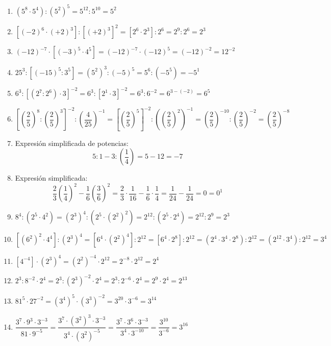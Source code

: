 \documentclass[a4paper,12pt]{article}
\begin{document}
\begin{enumerate}[label=\alph*.]
    \item $(5^{8} \cdot 5^{4}) : (5^{2})^{5} = 5^{12} : 5^{10} = 5^{2}$
    \item $[(-2)^{6} \cdot (+2)^{3}] : [(+2)^{3}]^{2} = [2^{6} \cdot 2^{3}] : 2^{6} = 2^{9} : 2^{6} = 2^{3}$
    \item $(-12)^{-7} \cdot [(-3)^{5} \cdot 4^{5}] = (-12)^{-7} \cdot (-12)^{5} = (-12)^{-2} = 12^{-2}$
    \item $25^{3} : [(-15)^{5} : 3^{5}] = (5^{2})^{3} : (-5)^{5} = 5^{6} : (-5^{5}) = -5^{1}$
    \item $6^{3} : [(2^{7} : 2^{6}) \cdot 3]^{-2} = 6^{3} : [2^{1} \cdot 3]^{-2} = 6^{3} : 6^{-2} = 6^{3 - (-2)} = 6^{5}$
    \item $\left[\left(\dfrac{2}{5}\right)^{8} : \left(\dfrac{2}{5}\right)^{3}\right]^{-2} : \left(\dfrac{4}{25}\right)^{-1} = \left[\left(\dfrac{2}{5}\right)^{5}\right]^{-2} : \left(\left(\dfrac{2}{5}\right)^{2}\right)^{-1} = \left(\dfrac{2}{5}\right)^{-10} : \left(\dfrac{2}{5}\right)^{-2} = \left(\dfrac{2}{5}\right)^{-8}$
    \item Expresión simplificada de potencias:
    \[ 5 : 1 - 3 : \left(\frac{1}{4}\right) = 5 - 12 = -7 \]
    \item Expresión simplificada:
    \[ \frac{2}{3}\left(\frac{1}{4}\right)^{2} - \frac{1}{6}\left(\frac{3}{6}\right)^{2} = \frac{2}{3} \cdot \frac{1}{16} - \frac{1}{6} \cdot \frac{1}{4} = \frac{1}{24} - \frac{1}{24} = 0 = 0^{1} \]
    \item $8^{4} : (2^{5} \cdot 4^{2}) = (2^{3})^{4} : (2^{5} \cdot (2^{2})^{2}) = 2^{12} : (2^{5} \cdot 2^{4}) = 2^{12} : 2^{9} = 2^{3}$
    \item $[(6^{2})^{2} \cdot 4^{4}] : (2^{3})^{4} = [6^{4} \cdot (2^{2})^{4}] : 2^{12} = [6^{4} \cdot 2^{8}] : 2^{12} = (2^{4} \cdot 3^{4} \cdot 2^{8}) : 2^{12} = (2^{12} \cdot 3^{4}) : 2^{12} = 3^{4}$
    \item $[4^{-4}] \cdot (2^{3})^{4} = (2^{2})^{-4} \cdot 2^{12} = 2^{-8} \cdot 2^{12} = 2^{4}$
    \item $2^{3} : 8^{-2} \cdot 2^{4} = 2^{3} : (2^{3})^{-2} \cdot 2^{4} = 2^{3} : 2^{-6} \cdot 2^{4} = 2^{9} \cdot 2^{4} = 2^{13}$
    \item $81^{5} \cdot 27^{-2} = (3^{4})^{5} \cdot (3^{3})^{-2} = 3^{20} \cdot 3^{-6} = 3^{14}$
    \item $\dfrac{3^{7} \cdot 9^{3} \cdot 3^{-3}}{81 \cdot 9^{-5}} = \dfrac{3^{7} \cdot (3^{2})^{3} \cdot 3^{-3}}{3^{4} \cdot (3^{2})^{-5}} = \dfrac{3^{7} \cdot 3^{6} \cdot 3^{-3}}{3^{4} \cdot 3^{-10}} = \dfrac{3^{10}}{3^{-6}} = 3^{16}$
\end{enumerate}
\end{document}

